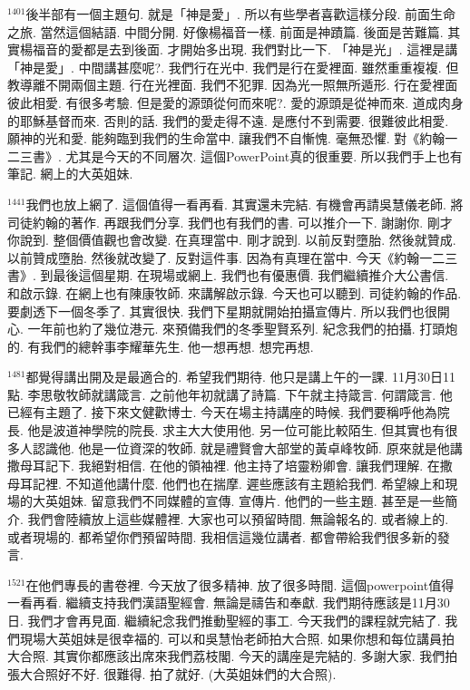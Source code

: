 \documentclass{book}
\begin{document}
$^{1401}$後半部有一個主題句.
就是「神是愛」.
所以有些學者喜歡這樣分段.
前面生命之旅.
當然這個結語.
中間分開.
好像楊福音一樣.
前面是神蹟篇.
後面是苦難篇.
其實楊福音的愛都是去到後面.
才開始多出現.
我們對比一下.
「神是光」.
這裡是講「神是愛」.
中間講甚麼呢?.
我們行在光中.
我們是行在愛裡面.
雖然重重複複.
但教導離不開兩個主題.
行在光裡面.
我們不犯罪.
因為光一照無所遁形.
行在愛裡面彼此相愛.
有很多考驗.
但是愛的源頭從何而來呢?.
愛的源頭是從神而來.
道成肉身的耶穌基督而來.
否則的話.
我們的愛走得不遠.
是應付不到需要.
很難彼此相愛.
願神的光和愛.
能夠臨到我們的生命當中.
讓我們不自慚愧.
毫無恐懼.
對《約翰一二三書》.
尤其是今天的不同層次.
這個PowerPoint真的很重要.
所以我們手上也有筆記.
網上的大英姐妹.

$^{1441}$我們也放上網了.
這個值得一看再看.
其實還未完結.
有機會再請吳慧儀老師.
將司徒約翰的著作.
再跟我們分享.
我們也有我們的書.
可以推介一下.
謝謝你.
剛才你說到.
整個價值觀也會改變.
在真理當中.
剛才說到.
以前反對墮胎.
然後就贊成.
以前贊成墮胎.
然後就改變了.
反對這件事.
因為有真理在當中.
今天《約翰一二三書》.
到最後這個星期.
在現場或網上.
我們也有優惠價.
我們繼續推介大公書信.
和啟示錄.
在網上也有陳康牧師.
來講解啟示錄.
今天也可以聽到.
司徒約翰的作品.
要劇透下一個冬季了.
其實很快.
我們下星期就開始拍攝宣傳片.
所以我們也很開心.
一年前也約了幾位港元.
來預備我們的冬季聖賢系列.
紀念我們的拍攝.
打頭炮的.
有我們的總幹事李耀華先生.
他一想再想.
想完再想.

$^{1481}$都覺得講出開及是最適合的.
希望我們期待.
他只是講上午的一課.
11月30日11點.
李思敬牧師就講箴言.
之前他年初就講了詩篇.
下午就主持箴言.
何謂箴言.
他已經有主題了.
接下來文健歡博士.
今天在場主持講座的時候.
我們要稱呼他為院長.
他是波道神學院的院長.
求主大大使用他.
另一位可能比較陌生.
但其實也有很多人認識他.
他是一位資深的牧師.
就是禮賢會大部堂的黃卓峰牧師.
原來就是他講撒母耳記下.
我絕對相信.
在他的領袖裡.
他主持了培靈粉卿會.
讓我們理解.
在撒母耳記裡.
不知道他講什麼.
他們也在揣摩.
遲些應該有主題給我們.
希望線上和現場的大英姐妹.
留意我們不同媒體的宣傳.
宣傳片.
他們的一些主題.
甚至是一些簡介.
我們會陸續放上這些媒體裡.
大家也可以預留時間.
無論報名的.
或者線上的.
或者現場的.
都希望你們預留時間.
我相信這幾位講者.
都會帶給我們很多新的發言.

$^{1521}$在他們專長的書卷裡.
今天放了很多精神.
放了很多時間.
這個powerpoint值得一看再看.
繼續支持我們漢語聖經會.
無論是禱告和奉獻.
我們期待應該是11月30日.
我們才會再見面.
繼續紀念我們推動聖經的事工.
今天我們的課程就完結了.
我們現場大英姐妹是很幸福的.
可以和吳慧怡老師拍大合照.
如果你想和每位講員拍大合照.
其實你都應該出席來我們荔枝閣.
今天的講座是完結的.
多謝大家.
我們拍張大合照好不好.
很難得.
拍了就好.
(大英姐妹們的大合照).
\newpage
\end{document}
